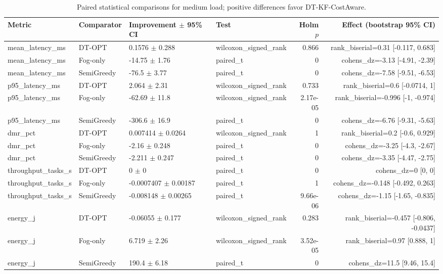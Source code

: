 \begin{table}[t]
\centering
\caption{Paired statistical comparisons for medium load; positive differences favor DT-KF-CostAware.}
\label{tab:independent_paired_medium}
\scriptsize
\begin{tabular}{llllrr}
\toprule
Metric & Comparator & Improvement $\pm$ 95\% CI & Test & Holm $p$ & Effect (bootstrap 95\% CI) \\
\midrule
mean\_latency\_ms & DT-OPT & 0.1576 $\pm$ 0.288 & wilcoxon\_signed\_rank & 0.866 & rank\_biserial=0.31 [-0.117, 0.683] \\
mean\_latency\_ms & Fog-only & -14.75 $\pm$ 1.76 & paired\_t & 0 & cohens\_dz=-3.13 [-4.91, -2.39] \\
mean\_latency\_ms & SemiGreedy & -76.5 $\pm$ 3.77 & paired\_t & 0 & cohens\_dz=-7.58 [-9.51, -6.53] \\
p95\_latency\_ms & DT-OPT & 2.064 $\pm$ 2.31 & wilcoxon\_signed\_rank & 0.733 & rank\_biserial=0.6 [-0.0714, 1] \\
p95\_latency\_ms & Fog-only & -62.69 $\pm$ 11.8 & wilcoxon\_signed\_rank & 2.17e-05 & rank\_biserial=-0.996 [-1, -0.974] \\
p95\_latency\_ms & SemiGreedy & -306.6 $\pm$ 16.9 & paired\_t & 0 & cohens\_dz=-6.76 [-9.31, -5.63] \\
dmr\_pct & DT-OPT & 0.007414 $\pm$ 0.0264 & wilcoxon\_signed\_rank & 1 & rank\_biserial=0.2 [-0.6, 0.929] \\
dmr\_pct & Fog-only & -2.16 $\pm$ 0.248 & paired\_t & 0 & cohens\_dz=-3.25 [-4.3, -2.67] \\
dmr\_pct & SemiGreedy & -2.211 $\pm$ 0.247 & paired\_t & 0 & cohens\_dz=-3.35 [-4.47, -2.75] \\
throughput\_tasks\_s & DT-OPT & 0 $\pm$ 0 & paired\_t & 0 & cohens\_dz=0 [0, 0] \\
throughput\_tasks\_s & Fog-only & -0.0007407 $\pm$ 0.00187 & paired\_t & 1 & cohens\_dz=-0.148 [-0.492, 0.263] \\
throughput\_tasks\_s & SemiGreedy & -0.008148 $\pm$ 0.00265 & paired\_t & 9.66e-06 & cohens\_dz=-1.15 [-1.65, -0.835] \\
energy\_j & DT-OPT & -0.06055 $\pm$ 0.177 & wilcoxon\_signed\_rank & 0.283 & rank\_biserial=-0.457 [-0.806, -0.0437] \\
energy\_j & Fog-only & 6.719 $\pm$ 2.26 & wilcoxon\_signed\_rank & 3.52e-05 & rank\_biserial=0.97 [0.888, 1] \\
energy\_j & SemiGreedy & 190.4 $\pm$ 6.18 & paired\_t & 0 & cohens\_dz=11.5 [9.46, 15.4] \\

\end{tabular}
\end{table}
